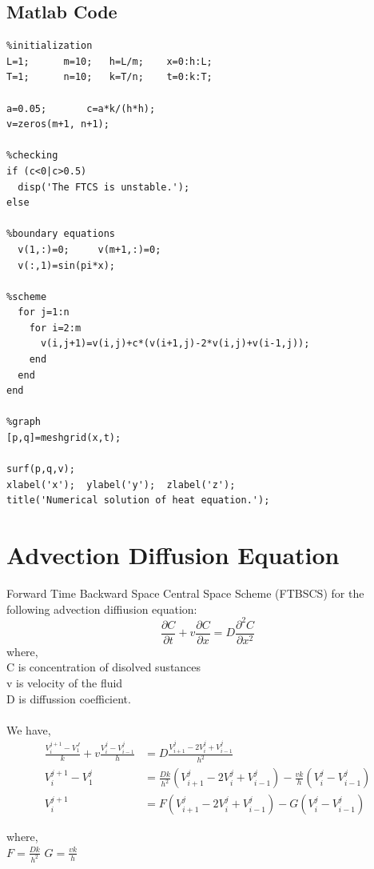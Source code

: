 \section{Matlab Code}
  \begin{verbatim}
%initialization
L=1;      m=10;   h=L/m;    x=0:h:L;
T=1;      n=10;   k=T/n;    t=0:k:T;

a=0.05;       c=a*k/(h*h);
v=zeros(m+1, n+1);

%checking
if (c<0|c>0.5)
  disp('The FTCS is unstable.');
else

%boundary equations
  v(1,:)=0;     v(m+1,:)=0;
  v(:,1)=sin(pi*x);

%scheme
  for j=1:n
    for i=2:m
      v(i,j+1)=v(i,j)+c*(v(i+1,j)-2*v(i,j)+v(i-1,j));
    end
  end
end

%graph
[p,q]=meshgrid(x,t);

surf(p,q,v);
xlabel('x');  ylabel('y');  zlabel('z');
title('Numerical solution of heat equation.');
\end{verbatim}

\chapter{Advection Diffusion Equation}
Forward Time Backward Space Central Space Scheme (FTBSCS) for the following advection diffiusion equation:\\
\[\frac{\partial C}{\partial t} + v\frac{\partial C}{\partial x} = D\frac{\partial^2 C}{\partial x^2}\]
where,\\
C is concentration of disolved sustances \\
v is velocity of the fluid \\
D is diffussion coefficient. \\ \\

We have,
\begin{align*}
  \frac{V_i^{j+1}-V_1^J}{k} + v\frac{V_i^j - V_{i-1}^j}{h} &= D\frac{V_{i+1}^j-2V_i^j+V_{i-1}^j}{h^2}\\
  V_i^{j+1}-V_1^j &= \frac{Dk}{h^2}(V_{i+1}^j-2V_i^j+V_{i-1}^j)-\frac{vk}{h}(V_i^j - V_{i-1}^j)\\
  V_i^{j+1} &= F(V_{i+1}^j-2V_i^j+V_{i-1}^j)-G(V_i^j - V_{i-1}^j)
\end{align*}

where,\\
\(F=\frac{Dk}{h^2}\) \hspace{5mm} \(G= \frac{vk}{h}\)

